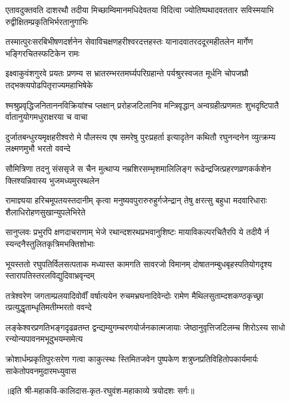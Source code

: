 \fourlineindentedshloka
{एतावदुक्तवति दाशरथौ तदीया}
{मिच्छाम्विमानमधिदेवतया विदित्वा}
{ज्योतिष्पथादवततार सविस्मयाभि}
{रुद्वीक्षितम्प्रकृतिभिर्भरतानुगाभिः} %

\fourlineindentedshloka
{तस्मात्पुरःसरबिभीषणदर्शनेन}
{सेवाविचक्षणहरीश्वरदत्तहस्तः}
{यानादवातरददूरमहीतलेन}
{मार्गेण भङ्गिरचितस्फटिकेन रामः} %

\fourlineindentedshloka
{इक्ष्वाकुवंशगुरवे प्रयतः प्रणम्य}
{स भ्रातरम्भरतमर्घ्यपरिग्रहान्ते}
{पर्यश्रुरस्वजत मूर्धनि चोपजघ्रौ}
{तद्भक्त्यपोढपितृराज्यमहाभिषेके} %

\fourlineindentedshloka
{श्मश्रुप्रवृद्धिजनिताननविक्रियांश्च}
{प्लक्षान् प्ररोहजटिलानिव मन्त्रिवृद्धान्}
{अन्वग्रहीत्प्रणमतः शुभदृष्टिपातै}
{र्वातानुयोगमधुराक्षरया च वाचा} %

\fourlineindentedshloka
{दुर्जातबन्धुरयमृक्षहरीश्वरो मे}
{पौलस्त्य एष समरेषु पुरःप्रहर्ता}
{इत्यादृतेन कथितौ रघुनन्दनेन}
{व्युत्क्रम्य लक्ष्मणमुभौ भरतो ववन्दे} %

\fourlineindentedshloka
{सौमित्रिणा तदनु संससृजे स चैन}
{मुत्थाप्य नम्रशिरसम्भृशमालिलिङ्ग}
{रूढेन्द्रजित्प्रहरणव्रणकर्कशेन}
{क्लिश्यन्निवास्य भुजमध्यमुरस्थलेन} %

\fourlineindentedshloka
{रामाज्ञ्यया हरिचमूपतयस्तदानीम्}
{कृत्वा मनुष्यवपुरारुरुहुर्गजेन्द्रान्}
{तेषु क्षरत्सु बहुधा मदवारिधाराः}
{शैलाधिरोहणसुखान्युपलेभिरेते} %

\fourlineindentedshloka
{सानुप्लवः प्रभुरपि क्षणदाचराणाम्}
{भेजे रथान्दशरथप्रभवानुशिष्टः}
{मायाविकल्परचितैरपि ये तदीयै}
{र्न स्यन्दनैस्तुलितकृत्रिमभक्तिशोभाः} %

\fourlineindentedshloka
{भूयस्ततो रघुपतिर्विलसत्पताक}
{मध्यास्त कामगति सावरजो विमानम्}
{दोषातनम्बुधबृहस्पतियोगदृश्य}
{स्तारापतिस्तरलविद्युदिवाभ्रवृन्दम्} %

\fourlineindentedshloka
{तत्रेश्वरेण जगताम्प्रलयादिवोर्वीं}
{वर्षात्ययेन रुचमभ्रघनादिवेन्दोः}
{रामेण मैथिलसुताम्दशकण्ठकृच्छ्रा}
{त्प्रत्युद्धृताम्धृतिमतीम्भरतो ववन्दे} %

\fourlineindentedshloka
{लङ्केश्वरप्रणतिभङ्गदृढव्रतम्त}
{द्वन्द्यम्युगम्चरणयोर्जनकात्मजायाः}
{जेष्ठानुवृत्तिजटिलम्च शिरोऽस्य साधो}
{रन्योन्यपावनमभूदुभयम्समेत्य} %

\fourlineindentedshloka
{क्रोशार्धम्प्रकृतिपुरःसरेण गत्वा}
{काकुत्स्थः स्तिमितजवेन पुष्पकेण}
{शत्रुघ्नप्रतिविहितोपकार्यमार्यः}
{साकेतोपवनमुदारमध्युवास} %

॥इति श्री-महाकवि-कालिदास-कृत-रघुवंश-महाकाव्ये त्रयोदशः सर्गः॥

